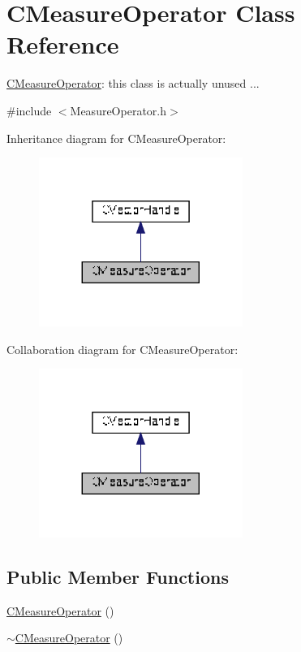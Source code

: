 \hypertarget{classCMeasureOperator}{}\section{C\+Measure\+Operator Class Reference}
\label{classCMeasureOperator}


\hyperlink{classCMeasureOperator}{C\+Measure\+Operator}\+: this class is actually unused ...  




{\ttfamily \#include $<$Measure\+Operator.\+h$>$}



Inheritance diagram for C\+Measure\+Operator\+:\nopagebreak
\begin{figure}[H]
\begin{center}
\leavevmode
\includegraphics[width=188pt]{d4/dde/classCMeasureOperator__inherit__graph}
\end{center}
\end{figure}


Collaboration diagram for C\+Measure\+Operator\+:\nopagebreak
\begin{figure}[H]
\begin{center}
\leavevmode
\includegraphics[width=188pt]{d2/dcf/classCMeasureOperator__coll__graph}
\end{center}
\end{figure}
\subsection*{Public Member Functions}
\begin{DoxyCompactItemize}
\item 
\hyperlink{classCMeasureOperator_abdf6e7568d2d9c5313299ff6b7a6012e}{C\+Measure\+Operator} ()
\item 
\hyperlink{classCMeasureOperator_acf2f26e41d5228767e4c098988cfaa89}{$\sim$\+C\+Measure\+Operator} ()
\end{DoxyCompactItemize}
